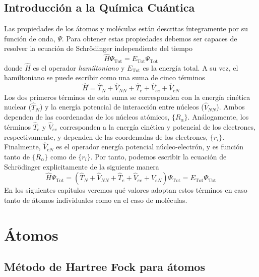 \documentclass{tufte-book}
\begin{document}
\section{Introducción a la Química Cuántica}
Las propiedades de los átomos y moléculas están descritas
íntegramente por su función de onda, $\Psi$. Para obtener estas 
propiedades debemos ser capaces de resolver la ecuación 
de Schrödinger independiente del tiempo
\begin{equation}
    \hat{H}\Psi_\mathrm{Tot}=E_\mathrm{Tot}\Psi_\mathrm{Tot} 
\end{equation}
donde $\hat{H}$ es el operador \textit{hamiltoniano} y
$E_\mathrm{Tot}$ es la energía total. A su vez, el 
hamiltoniano se puede escribir como una suma de cinco términos
\begin{equation}
    \hat{H} = \hat{T}_N + \hat{V}_{NN} + \hat{T}_e + \hat{V}_{ee} +\hat{V}_{eN}
\end{equation}
Los dos primeros términos de esta suma se corresponden con la 
energía cinética nuclear ($\hat{T}_N$) y la energía potencial de
interacción entre núcleos ($\hat{V}_{NN}$). Ambos dependen de las
coordenadas de los núcleos atómicos, $\{R_\alpha\}$. Análogamente, 
los términos $\hat{T}_e $ y $\hat{V}_{ee}$ corresponden a la 
energía cinética y potencial de los electrones, respectivamente, y
dependen de las coordenadas de los electrones, $\{r_i\}$.
Finalmente, $\hat{V}_{eN}$ es el operador energía potencial
núcleo-electrón, y es función tanto de $\{R_\alpha\}$ como de 
$\{r_i\}$. Por tanto, podemos escribir la ecuación de Schrödinger
explicitamente de la siguiente manera
\begin{equation}
    \hat{H}\Psi_\mathrm{Tot}   =
    (\hat{T}_N + \hat{V}_{NN} + \hat{T}_e + \hat{V}_{ee} +\hat{V}_{eN})\Psi_\mathrm{Tot} 
    = E_\mathrm{Tot}\Psi_\mathrm{Tot}
    \label{eq:hamilt_terms}
\end{equation}
En los siguientes capítulos veremos qué valores adoptan
estos términos en caso tanto de átomos individuales
como en el caso de moléculas.

\chapter{Átomos}
\section{Método de Hartree Fock para átomos}
\end{document}
